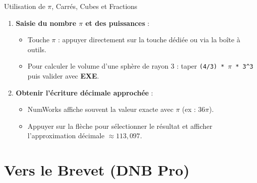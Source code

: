 \begin{tpinfo}{Utilisation de $\pi$, Carrés, Cubes et Fractions}
\begin{enumerate}[leftmargin=1.5em, itemsep=2pt]
    \item \textbf{Saisie du nombre $\pi$ et des puissances} :
    \begin{itemize}
        \item Touche \textbf{$\pi$} : appuyer directement sur la touche dédiée ou via la boîte à outils.
        \item Pour calculer le volume d'une sphère de rayon $3$ : taper \texttt{(4/3) * $\pi$ * 3\^{}3} puis valider avec \textbf{EXE}.
    \end{itemize}
    \item \textbf{Obtenir l'écriture décimale approchée} :
    \begin{itemize}
        \item NumWorks affiche souvent la valeur exacte avec $\pi$ (ex : $36\pi$).
        \item Appuyer sur la flèche pour sélectionner le résultat et afficher l'approximation décimale $\approx 113{,}097$.
    \end{itemize}
\end{enumerate}
\end{tpinfo}

\newpage

\section{Vers le Brevet (DNB Pro)}

